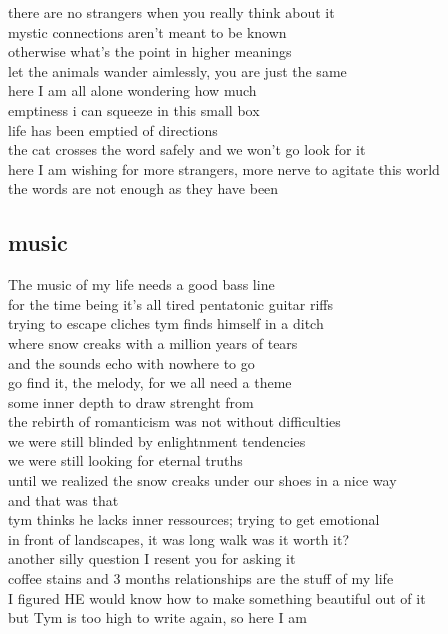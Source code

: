 \documentclass{article}
\begin{document}
there are no strangers when you really think about it\\
mystic connections aren't meant to be known\\
otherwise what's the point in higher meanings\\
let the animals wander aimlessly, you are just the same\\

here I am all alone wondering how much\\
emptiness i can squeeze in this small box\\
life has been emptied of directions\\
the cat crosses the word safely and we won't go look for it\\
here I am wishing for more strangers, more nerve to agitate this world\\
the words are not enough as they have been\\


\subsection{music}

The music of my life needs a good bass line\\
for the time being it's all tired pentatonic guitar riffs\\
trying to escape cliches tym finds himself in a ditch\\
where snow creaks with a million years of tears\\
and the sounds echo with nowhere to go\\
go find it, the melody, for we all need a theme\\

some inner depth to draw strenght from\\
the rebirth of romanticism was not without difficulties\\
we were still blinded by enlightnment tendencies\\
we were still looking for eternal truths\\
until we realized the snow creaks under our shoes in a nice way\\
and that was that\\


tym thinks he lacks inner ressources; trying to get emotional\\
in front of landscapes, it was long walk was it worth it?\\
another silly question I resent you for asking it\\
coffee stains and 3 months relationships are the stuff of my life\\
I figured HE would know how to make something beautiful out of it\\
but Tym is too high to write again, so here I am
\end{document}

